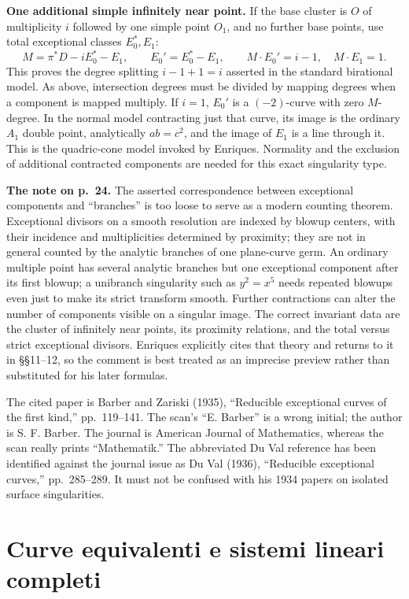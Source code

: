 \textbf{One additional simple infinitely near point.} If the base cluster is \(O\) of multiplicity \(i\) followed by one simple point \(O_1\), and no further base points, use total exceptional classes \(E_0^*,E_1\): \[
M=\pi^*D-iE_0^*-E_1,\qquad
E_0'=E_0^*-E_1,\qquad
M\cdot E_0'=i-1,\quad M\cdot E_1=1.
\] This proves the degree splitting \(i-1+1=i\) asserted in the standard birational model. As above, intersection degrees must be divided by mapping degrees when a component is mapped multiply. If \(i=1\), \(E_0'\) is a \((-2)\)-curve with zero \(M\)-degree. In the normal model contracting just that curve, its image is the ordinary \(A_1\) double point, analytically \(ab=c^2\), and the image of \(E_1\) is a line through it. This is the quadric-cone model invoked by Enriques. Normality and the exclusion of additional contracted components are needed for this exact singularity type.

\textbf{The note on p.~24.} The asserted correspondence between exceptional components and ``branches'' is too loose to serve as a modern counting theorem. Exceptional divisors on a smooth resolution are indexed by blowup centers, with their incidence and multiplicities determined by proximity; they are not in general counted by the analytic branches of one plane-curve germ. An ordinary multiple point has several analytic branches but one exceptional component after its first blowup; a unibranch singularity such as \(y^2=x^5\) needs repeated blowups even just to make its strict transform smooth. Further contractions can alter the number of components visible on a singular image. The correct invariant data are the cluster of infinitely near points, its proximity relations, and the total versus strict exceptional divisors. Enriques explicitly cites that theory and returns to it in §§11--12, so the comment is best treated as an imprecise preview rather than substituted for his later formulas.

The cited paper is Barber and Zariski (1935), ``Reducible exceptional curves of the first kind,'' pp.~119--141. The scan's ``E. Barber'' is a wrong initial; the author is S. F. Barber. The journal is American Journal of Mathematics, whereas the scan really prints ``Mathematik.'' The abbreviated Du Val reference has been identified against the journal issue as Du Val (1936), ``Reducible exceptional curves,'' pp.~285--289. It must not be confused with his 1934 papers on isolated surface singularities.

\section{Curve equivalenti e sistemi lineari completi}
\label{enriques-I-7}

